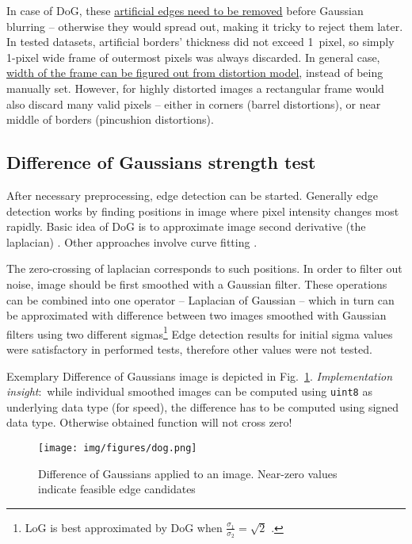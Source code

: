 In case of DoG, these \underline{artificial edges need to be removed} before Gaussian blurring -- otherwise they would spread out, making it tricky to reject them later. In tested datasets, artificial borders' thickness did not exceed 1~pixel, so simply 1-pixel wide frame of outermost pixels was always discarded. In general case, \underline{width of the frame can be figured out from distortion model}, instead of being manually set. However, for highly distorted images a rectangular frame would also discard many valid pixels -- either in corners (barrel distortions), or near middle of borders (pincushion distortions).

\subsection{Difference of Gaussians strength test}

After necessary preprocessing, edge detection can be started. Generally edge detection works by finding positions in image where pixel intensity changes most rapidly. Basic idea of DoG is to approximate image second derivative (the laplacian) \cite{szeliski}. Other approaches involve curve fitting \cite{fabijanska} \cite{devernay1995non}.

The zero-crossing of laplacian corresponds to such positions. In order to filter out noise, image should be first smoothed with a Gaussian filter. These operations can be combined into one operator -- Laplacian of Gaussian -- which in turn can be approximated with difference between two images smoothed with Gaussian filters using two different sigmas\footnote{LoG is best approximated by DoG when $\frac{\sigma_{1}}{\sigma_{2}} = \sqrt{2}$ \cite{sift}.} Edge detection results for initial sigma values were satisfactory in performed tests, therefore other values were not tested.

Exemplary Difference of Gaussians image is depicted in Fig.~\ref{fig:dog}. \textit{Implementation insight}:~while individual smoothed images can be computed using {\tt uint8} as underlying data type (for speed), the difference has to be computed using signed data type. Otherwise obtained function will not cross zero!

\begin{figure}[ht]
	\centering\texttt{[image: img/figures/dog.png]}
	\caption{ Difference of Gaussians applied to an image. Near-zero values indicate feasible edge candidates }
	\label{fig:dog}
\end{figure}

